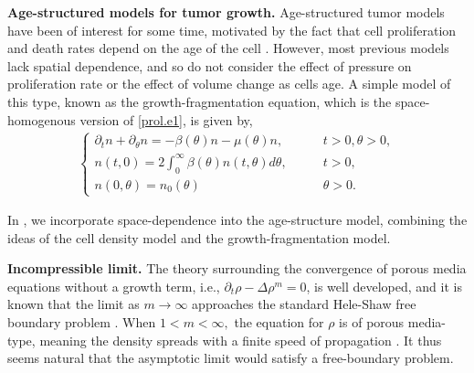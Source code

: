 \documentclass{amsart}
\begin{document}
\medskip
\noindent \textbf{Age-structured models for tumor growth.}
Age-structured tumor models have been of interest for some time, motivated by the fact that cell proliferation and death rates depend on the age of the cell \cite{DYSON200273, GGQ12, GYLLENBERG198767}. However, most previous models lack spatial dependence, and so do not consider the effect of pressure on proliferation rate or the effect of volume change as cells age. A simple model of this type, known as the growth-fragmentation equation, which is the space-homogenous version of \eqref{prol.e1}, is given by, 
\begin{align}\label{s.hom}
    \begin{cases}
        \partial_t n +\partial_\theta n =-\beta(\theta)n-\mu(\theta)n, \qquad &t>0,\theta>0, \\
        n(t,0)=2\int_{0}^{\infty}\beta(\theta)n(t,\theta)d\theta ,\qquad &t>0,\\
        n(0,\theta)=n_0(\theta)\qquad &\theta>0.
    \end{cases}
\end{align}
 
In \cite{llmw}, we incorporate space-dependence into the age-structure model, combining the ideas of the cell density model and the growth-fragmentation model. 

\medskip
\noindent \textbf{Incompressible limit.}
The theory surrounding the convergence of porous media equations without a growth term, i.e., $\partial_t \rho -\Delta \rho^m=0$, is well developed, and it is known that the limit as $m \rightarrow \infty$ approaches the standard Hele-Shaw free boundary problem \cite{benilin,elliott}.  When $1<m<\infty,$ the equation for $\rho$ is of porous media-type, meaning the density spreads with a finite speed of propagation \cite{pme}. It thus seems natural that the asymptotic limit would satisfy a free-boundary problem.
\end{document}
